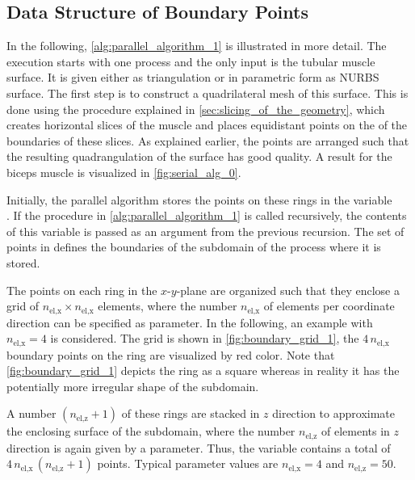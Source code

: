 \subsection{Data Structure of Boundary Points}\label{sec:data_structure_of_boundary_points}

In the following, \cref{alg:parallel_algorithm_1} is illustrated in more detail.
The execution starts with one process and the only input is the tubular muscle surface. It is given either as triangulation or in parametric form as NURBS surface.
The first step is to construct a quadrilateral mesh of this surface. This is done using the procedure explained in \cref{sec:slicing_of_the_geometry}, which creates horizontal slices of the muscle and places equidistant points on the  of the boundaries of these slices. As explained earlier, the points are arranged such that the resulting quadrangulation of the surface has good quality. A result for the biceps muscle is visualized in \cref{fig:serial_alg_0}.

Initially, the parallel algorithm stores the points on these rings in the variable \\. If the procedure in \cref{alg:parallel_algorithm_1} is called recursively, the contents of this variable is passed as an argument from the previous recursion.
The set of points in  defines the boundaries of the subdomain of the process where it is stored.

The points on each ring in the $x$-$y$-plane are organized such that they enclose a grid of $n_\text{el,x} \times n_\text{el,x}$ elements, where the number $n_\text{el,x}$ of elements per coordinate direction can be specified as parameter. In the following, an example with $n_\text{el,x}=4$ is considered. The grid is shown in \cref{fig:boundary_grid_1}, the $4\,n_\text{el,x}$ boundary points on the ring are visualized by red color. Note that \cref{fig:boundary_grid_1} depicts the ring as a square whereas in reality it has the potentially more irregular shape of the subdomain.

A number $(n_\text{el,z}+1)$ of these rings are stacked in $z$ direction to approximate the enclosing surface of the subdomain, where the number $n_\text{el,z}$ of elements in $z$ direction is again given by a parameter. Thus, the variable  contains a total of $4\,n_\text{el,x}\,(n_\text{el,z}+1)$ points. Typical parameter values are $n_\text{el,x}=4$ and $n_\text{el,z}=50$. 

